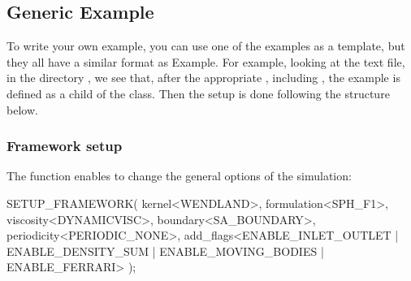 \documentclass{../GPUSPHtemplate}
\begin{document}
\subsection{Generic Example}

To write your own example, you can use one of the examples as a template, 
but they all have a similar format as Example.  
For example, looking at the text file,  in the directory 
, we see that, after the appropriate , 
including , the example is defined as a 
child of the  class.  
Then the setup is done following the structure below.

\subsubsection{Framework setup}

The  function enables to change the
 general options of the simulation:
\begin{ccode}
  SETUP_FRAMEWORK(
    kernel<WENDLAND>,
    formulation<SPH_F1>,
    viscosity<DYNAMICVISC>,
    boundary<SA_BOUNDARY>,
    periodicity<PERIODIC_NONE>,
    add_flags<ENABLE_INLET_OUTLET | ENABLE_DENSITY_SUM 
        | ENABLE_MOVING_BODIES | ENABLE_FERRARI>
  );
\end{ccode}
\end{document}
